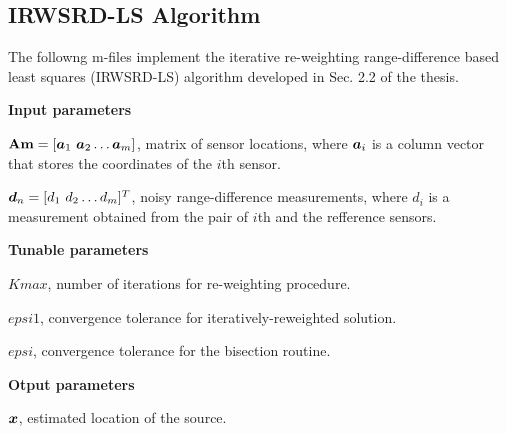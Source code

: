 \subsection{IRWSRD-LS Algorithm}

The followng m-files implement the iterative re-weighting range-difference based least squares (IRWSRD-LS) algorithm developed in Sec. 2.2 of the thesis. 

\phantom{m}

\noindent
\textbf{Input parameters}

\noindent
$\mbox{\textbf{Am}} = [\mbox{\boldmath$a$}_1 \ \mbox{\boldmath$a$}_2 \ldots \mbox{\boldmath$a$}_m]$, matrix of sensor locations, where $\mbox{\boldmath$a$}_i$ is a column vector that stores the coordinates of the $i$th sensor.

\noindent
$\mbox{\boldmath$d$}_n = [d_1 \ d_2 \ldots d_m]^T$, noisy range-difference measurements, where $d_i$ is a measurement obtained from the pair of $i$th and the refference sensors.

\noindent
\textbf{Tunable parameters}

\noindent
$Kmax$, number of iterations for re-weighting procedure.

\noindent
$epsi1$, convergence tolerance for iteratively-reweighted solution.

\noindent
$epsi$, convergence tolerance for the bisection routine.

\noindent
\textbf{Otput parameters}

\noindent
$\mbox{\boldmath$x$}$, estimated location of the source.

\phantom{m}

